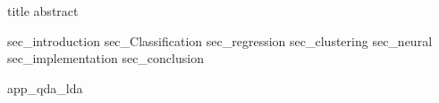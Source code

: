 \documentclass[12pt, a4paper]{article}
\begin{document}
{title}
{abstract}
\newpage
\tableofcontents
\newpage
\listoffigures
{sec_introduction}
{sec_Classification}
{sec_regression}
{sec_clustering}
{sec_neural}
{sec_implementation}
{sec_conclusion}
\newpage


\appendix
{app_qda_lda}
\end{document}
